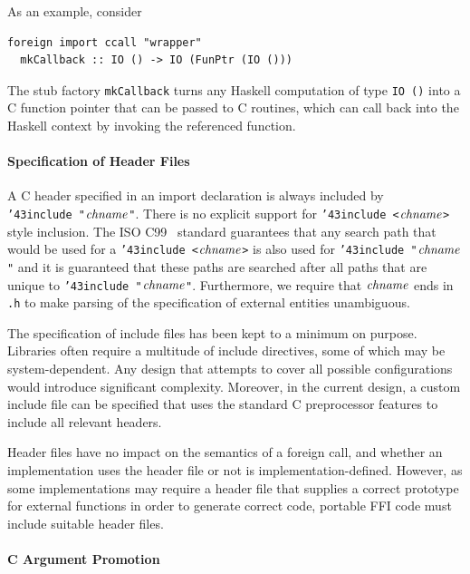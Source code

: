 \begin{description}
  As an example, consider
\bprog
{\small\begin{verbatim}
foreign import ccall "wrapper" 
  mkCallback :: IO () -> IO (FunPtr (IO ()))
\end{verbatim}}
\eprog
  The stub factory \mbox{\tt mkCallback} turns any Haskell computation of type
  \mbox{\tt IO\ ()} into a C function pointer that can be passed to C routines,
  which can call back into the Haskell context by invoking the referenced
  function.

\end{description}

\paragraph{Specification of Header Files}

A C header specified in an import declaration is always included by
\mbox{\tt {\char'43}include\ "}\mbox{$\it chname$}\mbox{\tt "}.  There is no explicit support for
\mbox{\tt {\char'43}include\ <}\mbox{$\it chname$}\mbox{\tt >} style inclusion.  The ISO C99~\cite{C99}
standard guarantees that any search path that would be used for a
\mbox{\tt {\char'43}include\ <}\mbox{$\it chname$}\mbox{\tt >} is also used for \mbox{\tt {\char'43}include\ "}\mbox{$\it chname$}\mbox{\tt "} and it is guaranteed that these paths are searched after
all paths that are unique to \mbox{\tt {\char'43}include\ "}\mbox{$\it chname$}\mbox{\tt "}.  Furthermore,
we require that \mbox{$\it chname$} ends in \mbox{\tt .h} to make parsing of the
specification of external entities unambiguous.
  
The specification of include files has been kept to a minimum on purpose.
Libraries often require a multitude of include directives, some of which may
be system-dependent.  Any design that attempts to cover all possible
configurations would introduce significant complexity.  Moreover, in the
current design, a custom include file can be specified that uses the standard
C preprocessor features to include all relevant headers.

Header files have no impact on the semantics of a foreign call, and whether an
implementation uses the header file or not is implementation-defined.
However, as some implementations may require a header file that supplies a
correct prototype for external functions in order to generate correct code,
portable FFI code must include suitable header files.

\paragraph{C Argument Promotion}

